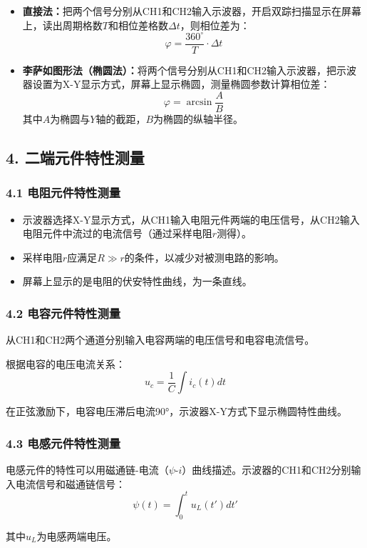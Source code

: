 \documentclass[12pt,a4paper]{article}
\begin{document}
\begin{itemize}
    \item \textbf{直接法：}把两个信号分别从CH1和CH2输入示波器，开启双踪扫描显示在屏幕上，读出周期格数$T$和相位差格数$\Delta t$，则相位差为：
    $$\varphi = \frac{360^\circ}{T} \cdot \Delta t$$
    
    \item \textbf{李萨如图形法（椭圆法）：}将两个信号分别从CH1和CH2输入示波器，把示波器设置为X-Y显示方式，屏幕上显示椭圆，测量椭圆参数计算相位差：
    $$\varphi = \arcsin\frac{A}{B}$$
    其中$A$为椭圆与$Y$轴的截距，$B$为椭圆的纵轴半径。
\end{itemize}

\subsection*{4. 二端元件特性测量}

\subsubsection*{4.1 电阻元件特性测量}
\begin{itemize}
    \item 示波器选择X-Y显示方式，从CH1输入电阻元件两端的电压信号，从CH2输入电阻元件中流过的电流信号（通过采样电阻$r$测得）。
    \item 采样电阻$r$应满足$R \gg r$的条件，以减少对被测电路的影响。
    \item 屏幕上显示的是电阻的伏安特性曲线，为一条直线。
\end{itemize}

\subsubsection*{4.2 电容元件特性测量}
从CH1和CH2两个通道分别输入电容两端的电压信号和电容电流信号。

根据电容的电压电流关系：
$$u_c = \frac{1}{C} \int i_c(t)dt$$

在正弦激励下，电容电压滞后电流90°，示波器X-Y方式下显示椭圆特性曲线。

\subsubsection*{4.3 电感元件特性测量}
电感元件的特性可以用磁通链-电流（$\psi$-$i$）曲线描述。示波器的CH1和CH2分别输入电流信号和磁通链信号：
$$\psi(t) = \int_0^t u_L(t')dt'$$

其中$u_L$为电感两端电压。
\end{document}
